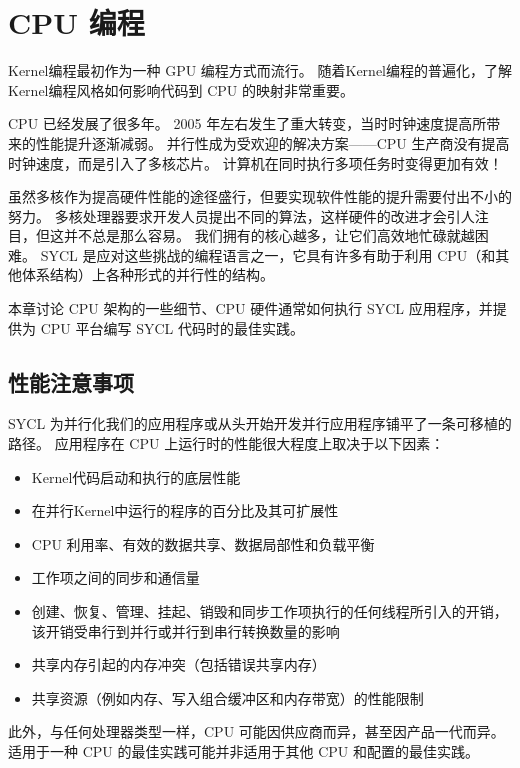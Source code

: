 \section{CPU 编程}
Kernel编程最初作为一种 GPU 编程方式而流行。 
随着Kernel编程的普遍化，了解Kernel编程风格如何影响代码到 CPU 的映射非常重要。

CPU 已经发展了很多年。 2005 年左右发生了重大转变，当时时钟速度提高所带来的性能提升逐渐减弱。 
并行性成为受欢迎的解决方案——CPU 生产商没有提高时钟速度，而是引入了多核芯片。 
计算机在同时执行多项任务时变得更加有效！

虽然多核作为提高硬件性能的途径盛行，但要实现软件性能的提升需要付出不小的努力。 
多核处理器要求开发人员提出不同的算法，这样硬件的改进才会引人注目，但这并不总是那么容易。 
我们拥有的核心越多，让它们高效地忙碌就越困难。 
SYCL 是应对这些挑战的编程语言之一，它具有许多有助于利用 CPU（和其他体系结构）上各种形式的并行性的结构。

本章讨论 CPU 架构的一些细节、CPU 硬件通常如何执行 SYCL 应用程序，并提供为 CPU 平台编写 SYCL 代码时的最佳实践。

\subsection{性能注意事项}
SYCL 为并行化我们的应用程序或从头开始开发并行应用程序铺平了一条可移植的路径。 
应用程序在 CPU 上运行时的性能很大程度上取决于以下因素：

\begin{itemize}
	\item Kernel代码启动和执行的底层性能

	\item 在并行Kernel中运行的程序的百分比及其可扩展性

	\item CPU 利用率、有效的数据共享、数据局部性和负载平衡

	\item 工作项之间的同步和通信量

	\item 创建、恢复、管理、挂起、销毁和同步工作项执行的任何线程所引入的开销，
	该开销受串行到并行或并行到串行转换数量的影响

	\item 共享内存引起的内存冲突（包括错误共享内存）

	\item 共享资源（例如内存、写入组合缓冲区和内存带宽）的性能限制
\end{itemize}

此外，与任何处理器类型一样，CPU 可能因供应商而异，甚至因产品一代而异。 
适用于一种 CPU 的最佳实践可能并非适用于其他 CPU 和配置的最佳实践。

